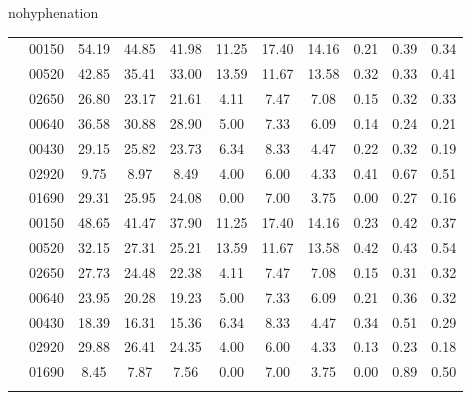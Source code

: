 \begin{hyphenrules}{nohyphenation}
\begin{table}[H]
{\begin{tabular}{>{\raggedleft\arraybackslash}p{4cm} lccCccCccc}
             & 00150 & 54.19 & 44.85 & 41.98 & 11.25 & 17.40 & 14.16 & 0.21 & 0.39 & 0.34 \\
            & 00520 &                       42.85 & 35.41 & 33.00 &     13.59 & 11.67 & 13.58 & 0.32 & 0.33 & 0.41 \\
            & 02650 &                       26.80 & 23.17 & 21.61 &     4.11 & 7.47 & 7.08 &    0.15 & 0.32 & 0.33 \\
            & 00640 &                       36.58 & 30.88 & 28.90 &     5.00 & 7.33 & 6.09 &    0.14 & 0.24 & 0.21 \\
            & 00430 &                       29.15 & 25.82 & 23.73 &     6.34 & 8.33 & 4.47 &    0.22 & 0.32 & 0.19 \\
            & 02920 &                       9.75 & 8.97 & 8.49 &        4.00 & 6.00 & 4.33 &    0.41 & 0.67 & 0.51 \\
            & 01690 &                       29.31 & 25.95 & 24.08 &     0.00 & 7.00 & 3.75 &    0.00 & 0.27 & 0.16 \\
            \midrule
            
             & 00150 & 48.65 & 41.47 & 37.90 & 11.25 & 17.40 & 14.16 & 0.23 & 0.42 & 0.37 \\
            & 00520 &                       32.15 & 27.31 & 25.21 &     13.59 & 11.67 & 13.58 & 0.42 & 0.43 & 0.54 \\
            & 02650 &                       27.73 & 24.48 & 22.38 &     4.11 & 7.47 & 7.08 &    0.15 & 0.31 & 0.32 \\
            & 00640 &                       23.95 & 20.28 & 19.23 &     5.00 & 7.33 & 6.09 &    0.21 & 0.36 & 0.32 \\
            & 00430 &                       18.39 & 16.31 & 15.36 &     6.34 & 8.33 & 4.47 &    0.34 & 0.51 & 0.29 \\
            & 02920 &                       29.88 & 26.41 & 24.35 &     4.00 & 6.00 & 4.33 &    0.13 & 0.23 & 0.18 \\
            & 01690 &                       8.45 & 7.87 & 7.56 &        0.00 & 7.00 & 3.75 &    0.00 & 0.89 & 0.50 \\
            \bottomrule
            
        \end{tabular}}
    \end{table}
\end{hyphenrules}

